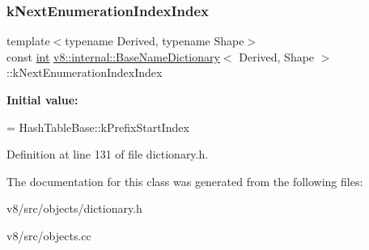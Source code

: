 \subsubsection{\texorpdfstring{k\+Next\+Enumeration\+Index\+Index}{kNextEnumerationIndexIndex}}
{\footnotesize\ttfamily template$<$typename Derived, typename Shape$>$ \\
const \mbox{\hyperlink{classint}{int}} \mbox{\hyperlink{classv8_1_1internal_1_1BaseNameDictionary}{v8\+::internal\+::\+Base\+Name\+Dictionary}}$<$ Derived, Shape $>$\+::k\+Next\+Enumeration\+Index\+Index\hspace{0.3cm}{\ttfamily [static]}}

{\bfseries Initial value\+:}
\begin{DoxyCode}
=
      HashTableBase::kPrefixStartIndex
\end{DoxyCode}


Definition at line 131 of file dictionary.\+h.



The documentation for this class was generated from the following files\+:\begin{DoxyCompactItemize}
\item 
v8/src/objects/dictionary.\+h\item 
v8/src/objects.\+cc\end{DoxyCompactItemize}

